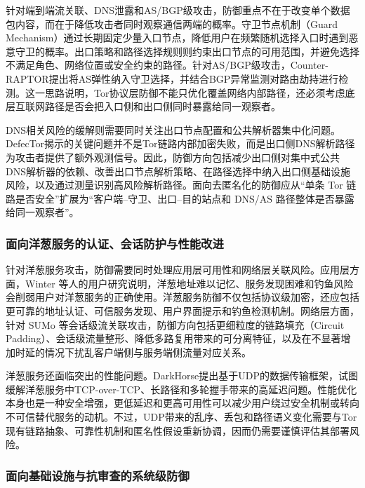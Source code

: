 针对端到端流关联、DNS泄露和AS/BGP级攻击，防御重点不在于改变单个数据包内容，而在于降低攻击者同时观察通信两端的概率。守卫节点机制（Guard Mechanism）通过长期固定少量入口节点，降低用户在频繁随机选择入口时遇到恶意守卫的概率。出口策略和路径选择规则则约束出口节点的可用范围，并避免选择不满足角色、网络位置或安全约束的路径\cite{torspec}。针对AS/BGP级攻击，Counter-RAPTOR提出将AS弹性纳入守卫选择，并结合BGP异常监测对路由劫持进行检测\cite{sun2017counter}。这一思路说明，Tor协议层防御不能只优化覆盖网络内部路径，还必须考虑底层互联网路径是否会把入口侧和出口侧同时暴露给同一观察者。

DNS相关风险的缓解则需要同时关注出口节点配置和公共解析器集中化问题。DefecTor揭示的关键问题并不是Tor链路内部加密失败，而是出口侧DNS解析路径为攻击者提供了额外观测信号\cite{greschbach2016effect}。因此，防御方向包括减少出口侧对集中式公共DNS解析器的依赖、改善出口节点解析策略、在路径选择中纳入出口侧基础设施风险，以及通过测量识别高风险解析路径。面向去匿名化的防御应从``单条 Tor 链路是否安全''扩展为``客户端--守卫、出口--目的站点和 DNS/AS 路径整体是否暴露给同一观察者''。

\subsubsection{面向洋葱服务的认证、会话防护与性能改进}

针对洋葱服务攻击，防御需要同时处理应用层可用性和网络层关联风险。应用层方面，Winter 等人的用户研究说明，洋葱地址难以记忆、服务发现困难和钓鱼风险会削弱用户对洋葱服务的正确使用\cite{winter2018tor}。洋葱服务防御不仅包括协议级加密，还应包括更可靠的地址认证、可信服务发现、用户界面提示和钓鱼检测机制。网络层方面，针对 SUMo 等会话级流关联攻击，防御方向包括更细粒度的链路填充（Circuit Padding）、会话级流量整形、降低多路复用带来的可分离特征，以及在不显著增加时延的情况下扰乱客户端侧与服务端侧流量对应关系\cite{lopes2024flow}。

洋葱服务还面临突出的性能问题。DarkHorse提出基于UDP的数据传输框架，试图缓解洋葱服务中TCP-over-TCP、长路径和多轮握手带来的高延迟问题\cite{al2023darkhorse}。性能优化本身也是一种安全增强，更低延迟和更高可用性可以减少用户绕过安全机制或转向不可信替代服务的动机。不过，UDP带来的乱序、丢包和路径语义变化需要与Tor现有链路抽象、可靠性机制和匿名性假设重新协调，因而仍需要谨慎评估其部署风险。

\subsubsection{面向基础设施与抗审查的系统级防御}

